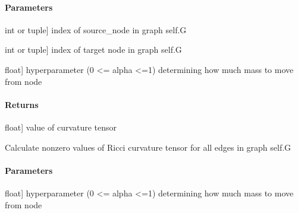 \documentclass[letterpaper,10pt,english]{sphinxmanual}
\begin{document}
\begin{fulllineitems}
\begin{fulllineitems}
\paragraph{Parameters}
\label{\detokenize{graph_ricci_curvature:id2}}\begin{description}
\sphinxlineitem{source\_node}{[}int or tuple{]}
\sphinxAtStartPar
index of source\_node in graph self.G

\sphinxlineitem{target\_node}{[}int or tuple{]}
\sphinxAtStartPar
index of target node in graph self.G

\sphinxlineitem{alpha}{[}float{]}
\sphinxAtStartPar
hyperparameter (0 \textless{}= alpha \textless{}=1) determining how much mass to move
from node

\end{description}


\paragraph{Returns}
\label{\detokenize{graph_ricci_curvature:returns}}\begin{description}
\sphinxlineitem{curvature}{[}float{]}
\sphinxAtStartPar
value of curvature tensor

\end{description}

\end{fulllineitems}


\begin{fulllineitems}
\label{\detokenize{graph_ricci_curvature:graph_ricci_curvature.ollivier_ricci_curvature.OllivierRicciCurvature.calculate_ricci_curvature}}
\pysigstartsignatures
{}
\pysigstopsignatures
\sphinxAtStartPar
Calculate nonzero values of Ricci curvature tensor for all edges in
graph self.G


\paragraph{Parameters}
\label{\detokenize{graph_ricci_curvature:id3}}\begin{description}
\sphinxlineitem{alpha}{[}float{]}
\sphinxAtStartPar
hyperparameter (0 \textless{}= alpha \textless{}=1) determining how much mass to move
from node


\end{description}
\end{fulllineitems}
\end{fulllineitems}
\end{document}
